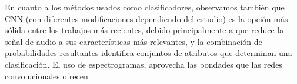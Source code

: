 \documentclass[11pt,a4paper,spanish]{book}
\begin{document}
	En cuanto a los métodos usados como clasificadores, observamos también que CNN (con diferentes modificaciones dependiendo del estudio) es la opción más sólida entre los trabajos más recientes, debido principalmente a que reduce la señal de audio a sus características más relevantes, y la combinación de probabilidades resultantes identifica conjuntos de atributos que determinan una clasificación. El uso de espectrogramas, aprovecha las bondades que las redes convolucionales ofrecen
	

	
	\printbibliography
\end{document}
